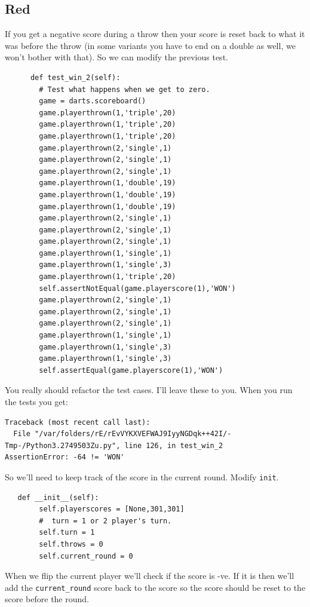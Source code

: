 \documentclass{paper}
\begin{document}
\subsection{Red}
If you get a negative score during a throw then your score is reset
back to what it was before the throw (in some variants you have to end
on a double as well, we won't bother with that).  So we can modify the
previous test.
\begin{lstlisting}
      def test_win_2(self):
        # Test what happens when we get to zero.
        game = darts.scoreboard()
        game.playerthrown(1,'triple',20)
        game.playerthrown(1,'triple',20)
        game.playerthrown(1,'triple',20)
        game.playerthrown(2,'single',1)
        game.playerthrown(2,'single',1)
        game.playerthrown(2,'single',1)
        game.playerthrown(1,'double',19)
        game.playerthrown(1,'double',19)
        game.playerthrown(1,'double',19)
        game.playerthrown(2,'single',1)
        game.playerthrown(2,'single',1)
        game.playerthrown(2,'single',1)
        game.playerthrown(1,'single',1)
        game.playerthrown(1,'single',3)
        game.playerthrown(1,'triple',20)
        self.assertNotEqual(game.playerscore(1),'WON')
        game.playerthrown(2,'single',1)
        game.playerthrown(2,'single',1)
        game.playerthrown(2,'single',1)
        game.playerthrown(1,'single',1)
        game.playerthrown(1,'single',3)
        game.playerthrown(1,'single',3)
        self.assertEqual(game.playerscore(1),'WON')
\end{lstlisting}
You really should refactor the test cases. I'll leave these to
you. When you run the tests you get:
\begin{verbatim}
Traceback (most recent call last):
  File "/var/folders/rE/rEvVYKXVEFWAJ9IyyNGDqk++42I/-Tmp-/Python3.2749503Zu.py", line 126, in test_win_2
AssertionError: -64 != 'WON'
\end{verbatim}
So we'll need to keep track of the score in the current round.
Modify {\tt init}.
\begin{lstlisting}
   def __init__(self):
        self.playerscores = [None,301,301]
        #  turn = 1 or 2 player's turn.    
        self.turn = 1
        self.throws = 0
        self.current_round = 0
\end{lstlisting}
When we flip the current player we'll check if the score is -ve. If it
is then we'll add the {\tt current\_round} score back to the score so the
score should be reset to the score before the round.
\end{document}
